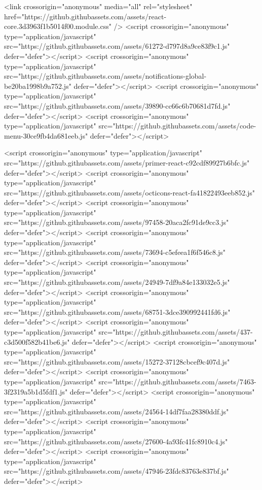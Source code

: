 <link crossorigin="anonymous" media="all" rel="stylesheet" href="https://github.githubassets.com/assets/react-core.3d3963f1b5014f00.module.css" />
<script crossorigin="anonymous" type="application/javascript" src="https://github.githubassets.com/assets/61272-d797d8a9ce83f9c1.js" defer="defer"></script>
<script crossorigin="anonymous" type="application/javascript" src="https://github.githubassets.com/assets/notifications-global-be20ba1998b9a752.js" defer="defer"></script>
<script crossorigin="anonymous" type="application/javascript" src="https://github.githubassets.com/assets/39890-cc66c6b70681d7fd.js" defer="defer"></script>
<script crossorigin="anonymous" type="application/javascript" src="https://github.githubassets.com/assets/code-menu-30ce9fb4da681eeb.js" defer="defer"></script>
  
  <script crossorigin="anonymous" type="application/javascript" src="https://github.githubassets.com/assets/primer-react-c92cdf89927b6bfc.js" defer="defer"></script>
<script crossorigin="anonymous" type="application/javascript" src="https://github.githubassets.com/assets/octicons-react-fa41822493eeb852.js" defer="defer"></script>
<script crossorigin="anonymous" type="application/javascript" src="https://github.githubassets.com/assets/97458-20aca2fc91de9cc3.js" defer="defer"></script>
<script crossorigin="anonymous" type="application/javascript" src="https://github.githubassets.com/assets/73694-c5efeea1f6f546c8.js" defer="defer"></script>
<script crossorigin="anonymous" type="application/javascript" src="https://github.githubassets.com/assets/24949-7df9a84e133032e5.js" defer="defer"></script>
<script crossorigin="anonymous" type="application/javascript" src="https://github.githubassets.com/assets/68751-3dce390992441fd6.js" defer="defer"></script>
<script crossorigin="anonymous" type="application/javascript" src="https://github.githubassets.com/assets/437-c3d500f582b41be6.js" defer="defer"></script>
<script crossorigin="anonymous" type="application/javascript" src="https://github.githubassets.com/assets/15272-37128cbcef9c407d.js" defer="defer"></script>
<script crossorigin="anonymous" type="application/javascript" src="https://github.githubassets.com/assets/7463-3f2319a5b1d5fdf1.js" defer="defer"></script>
<script crossorigin="anonymous" type="application/javascript" src="https://github.githubassets.com/assets/24564-14df7faa28380ddf.js" defer="defer"></script>
<script crossorigin="anonymous" type="application/javascript" src="https://github.githubassets.com/assets/27600-4a93fc41fc8910c4.js" defer="defer"></script>
<script crossorigin="anonymous" type="application/javascript" src="https://github.githubassets.com/assets/47946-23fdc83763e837bf.js" defer="defer"></script>
